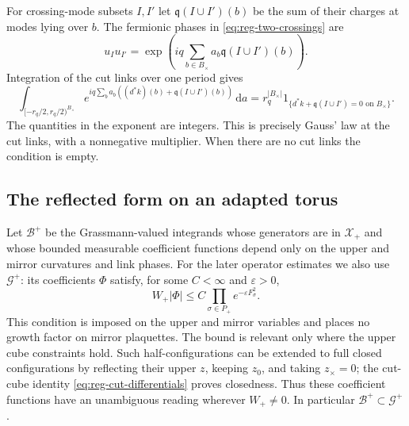 \documentclass[11pt,letterpaper,reqno]{amsart}
\newcommand{\dd}{\mathrm d}
\begin{document}
For crossing-mode subsets $I,I'$ let
$\mathfrak q(I\cup I')(b)$ be the sum of their charges at modes lying
over $b$. The fermionic phases in \eqref{eq:reg-two-crossings} are
\[
 u_Iu_{I'}=\exp\left(iq\sum_{b\in B_\times}
                              a_b\mathfrak q(I\cup I')(b)\right).
\]
Integration of the cut links over one period gives
\begin{equation}\label{eq:reg-gauss-indicator}
 \int_{[-r_q/2,r_q/2)^{B_\times}}
 e^{iq\sum_ba_b((d^*k)(b)+\mathfrak q(I\cup I')(b))}\,\dd a
 =r_q^{|B_\times|}
   1_{\{d^*k+\mathfrak q(I\cup I')=0\text{ on }B_\times\}}.
\end{equation}
The quantities in the exponent are integers. This is precisely
Gauss' law at the cut links, with a nonnegative multiplier. When
there are no cut links the condition is empty.

\subsection{The reflected form on an adapted torus}
\label{subsec:reg-reflected-form}

Let $\mathcal B^+$ be the Grassmann-valued integrands whose
generators are in $\mathcal X_+$ and whose bounded measurable
coefficient functions depend only on the upper and mirror
curvatures and link phases. For the later operator estimates we
also use $\mathcal G^+$: its coefficients $\Phi$ satisfy, for some
$C<\infty$ and $\varepsilon>0$,
\begin{equation}\label{eq:reg-upper-growth}
 W_+|\Phi|\le C\prod_{\sigma\in P_+}e^{-\varepsilon F_\sigma^2}.
\end{equation}
This condition is imposed on the upper and mirror variables and
places no growth factor on mirror plaquettes. The bound is relevant
only where the upper cube constraints hold. Such half-configurations
can be extended to full closed configurations by reflecting their
upper $z$, keeping $z_0$, and taking $z_\times=0$; the cut-cube
identity \eqref{eq:reg-cut-differentials} proves closedness. Thus
these coefficient functions have an unambiguous reading wherever
$W_+\ne0$. In particular $\mathcal B^+\subset\mathcal G^+$.
\end{document}
